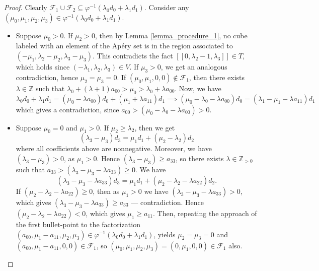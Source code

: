 \documentclass[12pt]{article}
\theoremstyle{remark}
\begin{document}
\begin{proof}
    Clearly $\mathcal{F}_1 \cup \mathcal{F}_2 \subseteq \varphi^{-1}(\lambda_0d_0 + \lambda_1d_1)$.
    Consider any $(\mu_0,\mu_1,\mu_2,\mu_3) \in \varphi^{-1}(\lambda_0d_0 + \lambda_1d_1)$.

    \begin{itemize}
    \item 

    Suppose $\mu_0 > 0$. If $\mu_2 > 0$, then by Lemma \ref{lemma_procedure_1}, no cube labeled with an element of the Ap{\'e}ry set is in the region associated to $(-\mu_1,\lambda_2-\mu_2,\lambda_3-\mu_3)$. This contradicts the fact $[[0,\lambda_2-1, \lambda_3]] \in T$, which holds since $(-\lambda_1,\lambda_2,\lambda_3) \in V$. If $\mu_3 > 0$, we get an analogous contradiction, hence $\mu_2=\mu_3 = 0$. If $(\mu_0,\mu_1,0,0) \notin \mathcal{F}_1$, then there exists $\lambda \in \mathbb{Z}$ such that $\lambda_0 + (\lambda+1) a_{00} > \mu_0  > \lambda_0 + \lambda a_{00}$. Now, we have
    \begin{equation}
        \lambda_0d_0 + \lambda_1d_1 = (\mu_0 - \lambda a_{00})d_0 + (\mu_1 + \lambda a_{11})d_1 \implies (\mu_0  - \lambda_0- \lambda a_{00})d_0 = (\lambda_1 - \mu_1 - \lambda a_{11})d_1
    \end{equation}
    which gives a contradiction, since $a_{00} > (\mu_0 - \lambda_0 - \lambda a_{00}) > 0$.

    \item
    Suppose $\mu_0 = 0$ and $\mu_1 > 0$. If $\mu_2 \geq \lambda_2$, then we get
    \begin{equation}
         (\lambda_3-\mu_3)d_3=\mu_1d_1 + (\mu_2 - \lambda_2)d_2
    \end{equation}
    where all coefficients above are nonnegative. Moreover, we have $(\lambda_3-\mu_3) > 0$, as $\mu_1 > 0$. Hence $(\lambda_3-\mu_3) \geq a_{33}$, so there exists $\lambda \in \mathbb{Z}_{>0}$ such that $a_{33} >(\lambda_3-\mu_3 - \lambda a_{33}) \geq 0$. We have 
    \begin{equation}
         (\lambda_3-\mu_3-\lambda a_{33})d_3=\mu_1d_1 + (\mu_2 - \lambda_2-\lambda a_{22})d_2.
    \end{equation}
    If $(\mu_2 - \lambda_2-\lambda a_{22}) \geq 0$, then as $\mu_1 > 0$ we have $(\lambda_3-\mu_3-\lambda a_{33}) > 0$, which gives $(\lambda_3-\mu_3-\lambda a_{33}) \geq a_{33}$ --- contradiction. Hence $(\mu_2 - \lambda_2-\lambda a_{22}) < 0$, which gives $\mu_1 \geq a_{11}$. Then, repeating the approach of the first bullet-point to the factorization $(a_{00},\mu_1 - a_{11},\mu_2,\mu_3) \in \varphi^{-1}(\lambda_0d_0 + \lambda_1d_1)$, yields $\mu_2 = \mu_3 = 0$ and $(a_{00},\mu_1 - a_{11},0,0) \in \mathcal{F}_1$, so $(\mu_0,\mu_1,\mu_2,\mu_3) =(0,\mu_1,0,0) \in \mathcal{F}_1$ also.
    

\end{itemize}
\end{proof}
\end{document}
